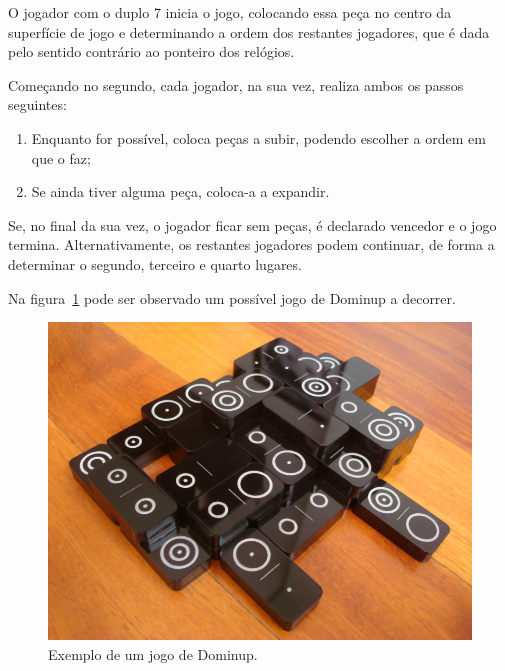 \documentclass[a4paper]{article}
\begin{document}
O jogador com o duplo 7 inicia o jogo, colocando essa peça no centro da superfície de jogo e determinando a ordem dos restantes jogadores, que é dada pelo sentido contrário ao ponteiro dos relógios. 

Começando no segundo, cada jogador, na sua vez, realiza ambos os passos seguintes:
\begin{enumerate}
	\item Enquanto for possível, coloca peças a subir, podendo escolher a ordem em que o faz;
	\item Se ainda tiver alguma peça, coloca-a a expandir.
\end{enumerate}

Se, no final da sua vez, o jogador ficar sem peças, é declarado vencedor e o jogo termina. Alternativamente, os restantes jogadores podem continuar, de forma a determinar o segundo, terceiro e quarto lugares.

Na figura~\ref{example} pode ser observado um possível jogo de Dominup a decorrer.

\begin{figure}[htbp]
\begin{center}
\includegraphics[scale=0.4]{example.jpg}
\caption{Exemplo de um jogo de Dominup.}
\label{example}
\end{center}
\end{figure}


\end{document}
